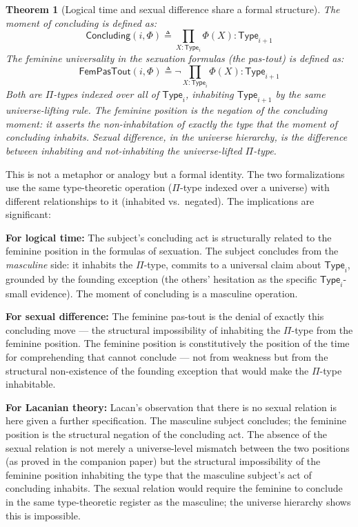 \documentclass[12pt]{article}
\newtheorem{theorem}{Theorem}
\theoremstyle{definition}
\theoremstyle{remark}
\newcommand{\Type}[1]{\mathsf{Type}_{#1}}
\begin{document}
\begin{theorem}[Logical time and sexual difference share a formal structure]
The moment of concluding is defined as:
\[
\mathsf{Concluding}(i, \Phi) \triangleq \prod_{X:\Type{i}} \Phi(X) : \Type{i+1}
\]
The feminine universality in the sexuation formulas (the pas-tout) is defined as:
\[
\mathsf{FemPasTout}(i, \Phi) \triangleq \lnot\prod_{X:\Type{i}} \Phi(X) : \Type{i+1}
\]
Both are $\Pi$-types indexed over all of $\Type{i}$, inhabiting $\Type{i+1}$ by the same universe-lifting rule. The feminine position is the \emph{negation} of the concluding moment: it asserts the non-inhabitation of exactly the type that the moment of concluding inhabits. Sexual difference, in the universe hierarchy, is the difference between inhabiting and not-inhabiting the universe-lifted $\Pi$-type.
\end{theorem}

This is not a metaphor or analogy but a formal identity. The two formalizations use the same type-theoretic operation ($\Pi$-type indexed over a universe) with different relationships to it (inhabited vs.\ negated). The implications are significant:

\textbf{For logical time:} The subject's concluding act is structurally related to the feminine position in the formulas of sexuation. The subject concludes from the \emph{masculine} side: it inhabits the $\Pi$-type, commits to a universal claim about $\Type{i}$, grounded by the founding exception (the others' hesitation as the specific $\Type{i}$-small evidence). The moment of concluding is a masculine operation.

\textbf{For sexual difference:} The feminine pas-tout is the denial of exactly this concluding move --- the structural impossibility of inhabiting the $\Pi$-type from the feminine position. The feminine position is constitutively the position of the time for comprehending that cannot conclude --- not from weakness but from the structural non-existence of the founding exception that would make the $\Pi$-type inhabitable.

\textbf{For Lacanian theory:} Lacan's observation that there is no sexual relation is here given a further specification. The masculine subject concludes; the feminine position is the structural negation of the concluding act. The absence of the sexual relation is not merely a universe-level mismatch between the two positions (as proved in the companion paper) but the structural impossibility of the feminine position inhabiting the type that the masculine subject's act of concluding inhabits. The sexual relation would require the feminine to conclude in the same type-theoretic register as the masculine; the universe hierarchy shows this is impossible.
\end{document}
